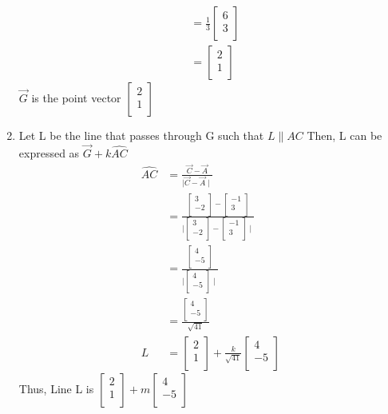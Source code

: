 \documentclass[12pt, a4paper,twocolumn]{article}
\newcommand{\columnvec}[2]{\begin{bmatrix}
           #1 \\
           #2 \\
         \end{bmatrix}}
\begin{document}
\begin{enumerate}
\begin{align*}
        \\
        &=\frac{1}{3}\columnvec{6}{3}
        \\
        &= \columnvec{2}{1} 
    \end{align*}
    $\vec{G}$ is the point vector $\columnvec{2}{1}$
\item Let L be the line that passes through G such that $L \parallel AC$
    Then, L can be expressed as $\vec{G} + k\hat{AC}$
    \begin{align*}
        \hat{AC} &= \frac{\vec{C} - \vec{A}}{\mid \vec{C} - \vec{A} \mid}
		\\        
        &= \frac{\columnvec{3}{-2} - \columnvec{-1}{3}}{\mid \columnvec{3}{-2} - \columnvec{-1}{3} \mid}
        \\
        &= \frac{\columnvec{4}{-5}}{\mid \columnvec{4}{-5} \mid}
		\\        
        &= \frac{\columnvec{4}{-5}}{\sqrt{41}}
        \\
        L &= \columnvec{2}{1} + \frac{k}{\sqrt{41}}\columnvec{4}{-5}
    \end{align*}
    Thus, Line L is $\columnvec{2}{1} + m\columnvec{4}{-5}$
\end{enumerate}
\end{document}
